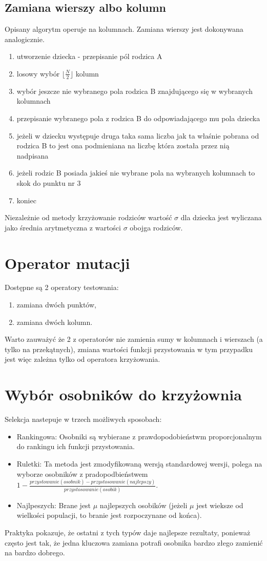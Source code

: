 \documentclass[a4paper,twoside,10pt]{article}
\begin{document}
		\subsection{Zamiana wierszy albo kolumn}
		Opisany algorytm operuje na kolumnach. Zamiana wierszy jest dokonywana analogicznie.
		\begin{enumerate}
			\item utworzenie dziecka - przepisanie pól rodzica A
			\item losowy wybór $ \lfloor\frac{N}{2}\rfloor $ kolumn
			\item wybór jeszcze nie wybranego pola rodzica B znajdującego się w wybranych kolumnach
			\item przepisanie wybranego pola z rodzica B do odpowiadającego mu pola dziecka
			\item jeżeli w dziecku występuje druga taka sama liczba jak ta właśnie pobrana od rodzica B to jest ona podmieniana na liczbę która została przez nią nadpisana
			\item jeżeli rodzic B posiada jakieś nie wybrane pola na wybranych kolumnach to skok do punktu nr 3
			\item koniec
		\end{enumerate}
		Niezależnie od metody krzyżowanie rodziców wartość $ \sigma $ dla dziecka jest wyliczana jako średnia arytmetyczna z wartości $ \sigma$ obojga rodziców.
\section{Operator mutacji}
Dostępne są 2 operatory testowania:
\begin{enumerate}
\item zamiana dwóch punktów,
\item zamiana dwóch kolumn.
\end{enumerate}
Warto zauważyć że 2 z operatorów nie zamienia sumy w kolumnach i wierszach (a tylko na przekątnych), zmiana wartości funkcji przystowania w tym przypadku jest więc zależna tylko od operatora krzyżowania.
\section{Wybór osobników do krzyżownia}
Selekcja nastepuje w trzech możliwych sposobach:
\begin{itemize}
\item Rankingowa:
Osobniki są wybierane z prawdopodobieństwm proporcjonalnym do rankingu ich funkcji przystowania.
\item Ruletki:
Ta metoda jest zmodyfikowaną wersją standardowej wersji, polega na wyborze osobników z pradopodbieństwem $1 - \frac{przystowanie(osobnik) - przystosowanie(najlepszy)}{przystosowanie(osobik)}$.
\item Najlpeszych:
Brane jest $\mu$ najlepszych osobików (jeżeli $\mu$ jest wieksze od wielkości populacji, to branie jest rozpoczynane od końca).
\end{itemize}
Praktyka pokazuje, że ostatni z tych typów daje najlepsze rezultaty, ponieważ często jest tak, że jedna kluczowa zamiana potrafi osobnika bardzo złego zamienić na bardzo dobrego.
\end{document}
